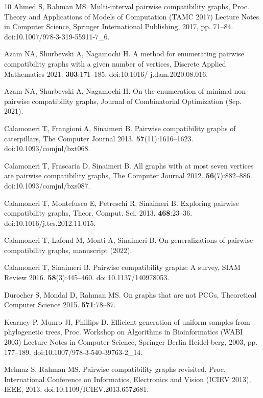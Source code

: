 \documentclass{fundam}
\begin{document}
\begin{thebibliography}{10}
 Ahmed S,  Rahman MS.
  Multi-interval pairwise compatibility graphs, Proc. Theory and Applications of Models of Computation (TAMC 2017) Lecture Notes in Computer Science, Springer International Publishing, 2017, pp. 71--84.  doi:10.1007/978-3-319-55911-7\_6.

 Azam NA,  Shurbevski A,  Nagamochi H.
  A method for enumerating pairwise
compatibility graphs with a given number of vertices, Discrete Applied Mathematics 2021. {\bf 303}:171--185. doi:10.1016/ j.dam.2020.08.016.

  Azam NA,  Shurbevski A,  Nagamochi H.
   On the enumeration of minimal non-pairwise compatibility graphs, Journal of Combinatorial Optimization (Sep. 2021).

 Calamoneri T,  Frangioni A,  Sinaimeri B.
  Pairwise compatibility graphs of caterpillars, The Computer Journal  2013. {\bf 57}(11):1616--1623. doi:10.1093/comjnl/bxt068.

 Calamoneri T, Frascaria D, Sinaimeri B.
  All graphs with at most seven vertices are pairwise compatibility graphs, The Computer Journal 2012. {\bf 56}(7):882--886.
  doi:10.1093/comjnl/bxs087.

 Calamoneri T, Montefusco E,  Petreschi R,  Sinaimeri B.
  Exploring pairwise compatibility graphs, Theor. Comput. Sci. 2013. {\bf 468}:23--36.  doi:10.1016/j.tcs.2012.11.015.

 Calamoneri T,  Lafond M,  Monti A,  Sinaimeri B.
  On generalizations of pairwise compatibility graphs, manuscript (2022).

 Calamoneri T,  Sinaimeri B.
  Pairwise compatibility graphs: A survey, SIAM Review 2016. {\bf 58}(3):445--460.  doi:10.1137/140978053.

 Durocher S,  Mondal D,   Rahman MS.
  On graphs that are not PCGs, Theoretical Computer Science 2015. {\bf 571}:78--87.

 Kearney P,  Munro JI,  Phillips D.
  Efficient generation of uniform samples from phylogenetic trees, Proc. Workshop on Algorithms in Bioinformatics (WABI 2003) Lecture Notes in Computer Science, Springer Berlin Heidel-berg, 2003, pp. 177–189.  doi:10.1007/978-3-540-39763-2\_14.

 Mehnaz S,  Rahman MS.
  Pairwise compatibility graphs revisited, Proc. International Conference on Informatics, Electronics and Vision (ICIEV 2013), IEEE, 2013.
   doi:10.1109/ICIEV.2013.6572681.


\end{thebibliography}
\end{document}
